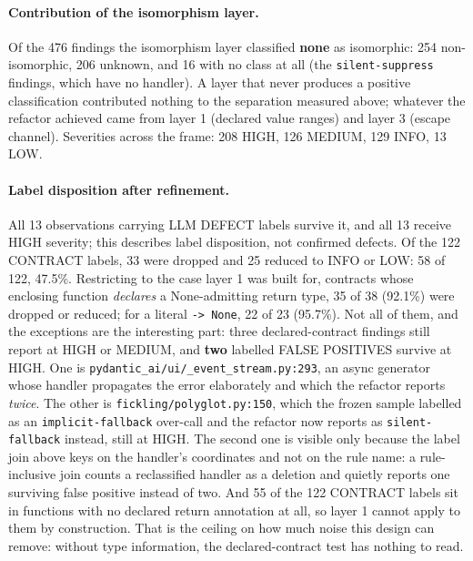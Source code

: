 \documentclass[10pt,a4paper]{article}
\begin{document}
\paragraph{Contribution of the isomorphism layer.} Of the 476 findings the
isomorphism layer classified \textbf{none} as isomorphic: 254 non-isomorphic, 206
unknown, and 16 with no class at all (the \texttt{silent-suppress} findings, which
have no handler). A layer that never produces a positive classification contributed
nothing to the separation measured above; whatever the refactor achieved came from
layer 1 (declared value ranges) and layer 3 (escape channel). Severities across the
frame: 208 HIGH, 126 MEDIUM, 129 INFO, 13 LOW.

\paragraph{Label disposition after refinement.} All 13 observations
carrying LLM DEFECT labels survive it, and all 13 receive HIGH severity; this
describes label disposition, not confirmed defects. Of the 122
CONTRACT labels, 33 were dropped and 25 reduced to INFO or LOW: 58 of 122, 47.5\%.
Restricting to the case layer 1 was built for, contracts whose enclosing function
\emph{declares} a None-admitting return type, 35 of 38 (92.1\%) were dropped or
reduced; for a literal \texttt{-> None}, 22 of 23 (95.7\%). Not all of them, and the
exceptions are the interesting part: three declared-contract findings still report
at HIGH or MEDIUM, and \textbf{two} labelled FALSE POSITIVES survive at HIGH. One is
\texttt{pydantic\_ai/ui/\_event\_stream.py:293}, an async generator whose handler
propagates the error elaborately and which the refactor reports \emph{twice}. The
other is \texttt{fickling/polyglot.py:150}, which the frozen sample labelled as an
\texttt{implicit-fallback} over-call and the refactor now reports as
\texttt{silent-fallback} instead, still at HIGH. The second one is visible only
because the label join above keys on the handler's coordinates and not on the rule
name: a rule-inclusive join counts a reclassified handler as a deletion and quietly
reports one surviving false positive instead of two. And 55
of the 122 CONTRACT labels sit in functions with no declared return annotation at
all, so layer 1 cannot apply to them by construction. That is the ceiling on how
much noise this design can remove: without type information, the declared-contract
test has nothing to read.
\end{document}
